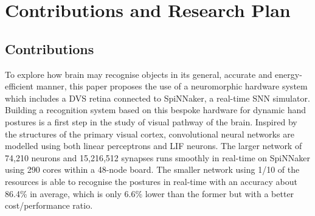 \chapter{Contributions and Research Plan}
\label{cha:plan}
\section{Contributions}
To explore how brain may recognise objects in its general, accurate and energy-efficient manner, this paper proposes the use of a neuromorphic hardware system which includes a DVS retina connected to SpiNNaker, a real-time SNN simulator.
Building a recognition system based on this bespoke hardware for dynamic hand postures is a first step in the study of visual pathway of the brain.
Inspired by the structures of the primary visual cortex, convolutional neural networks are modelled using both linear perceptrons and LIF neurons.
The larger network of 74,210 neurons and 15,216,512 synapses runs smoothly in real-time on SpiNNaker using 290 cores within a 48-node board.
The smaller network using 1/10 of the resources is able to recognise the postures in real-time with an accuracy about 86.4\% in average, which is 
only 6.6\% lower than the former but with a better cost/performance ratio.

